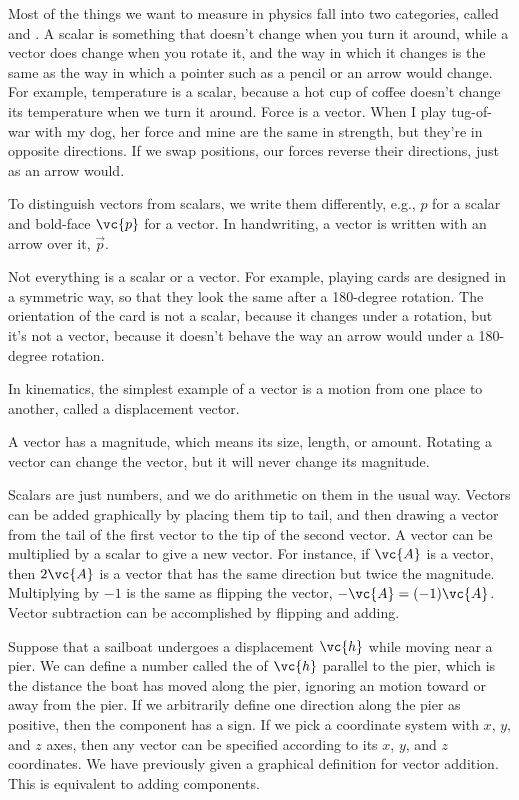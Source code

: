 Most of the things we want to measure in physics fall into two categories,
called  and .
A scalar is something
that doesn't change when you turn it around, while a vector does change
when you rotate it, and the way in which it changes is the same as the way
in which a pointer such as a pencil or an arrow would change. For example,
temperature is a scalar, because a hot cup of coffee doesn't change its temperature
when we turn it around. Force is a vector. When I play tug-of-war with my dog,
her force and mine are the same in strength, but they're in opposite directions.
If we swap positions, our forces reverse their directions, just as an arrow would.


To distinguish vectors from scalars, we write them differently, e.g., $p$ for a scalar
and bold-face $\vc{p}$ for a vector. In handwriting, a vector is written with an arrow
over it, $\overrightarrow{p}$.

Not everything is a scalar or a vector. For example, playing cards are designed
in a symmetric way, so that they look the same after a 180-degree rotation.
The orientation of the card is not a scalar, because it changes under a rotation,
but it's not a vector, because it doesn't behave the way an arrow would under a
180-degree rotation.

In kinematics, the simplest example of a vector is a motion from one place to another,
called a displacement vector.

A vector has a magnitude, which means its size, length, or amount. Rotating a vector
can change the vector, but it will never change its magnitude.

Scalars are just numbers, and we do arithmetic on them in the usual
way.  Vectors can be added graphically by placing them tip to tail,
and then drawing a vector from the tail of the first vector to the tip
of the second vector. A vector can be multiplied by a scalar to give a new
vector. For instance, if $\vc{A}$ is a vector, then $2\vc{A}$ is a vector
that has the same direction but twice the magnitude. Multiplying by $-1$ is
the same as flipping the vector, $-\vc{A}=(-1)\vc{A}$. Vector subtraction can be
accomplished by flipping and adding.


Suppose that a sailboat undergoes a displacement $\vc{h}$ while moving near
a pier.
We can define a number called the  of $\vc{h}$ parallel to
the pier, which is the distance the boat has moved along the pier, ignoring
an motion toward or away from the pier. If we arbitrarily define one direction
along the pier as positive, then the component has a sign. If we pick a coordinate system
with $x$, $y$, and $z$ axes, then any vector can be specified according to its
$x$, $y$, and $z$ coordinates. We have previously given a graphical definition for
vector addition. This is equivalent to adding components.
